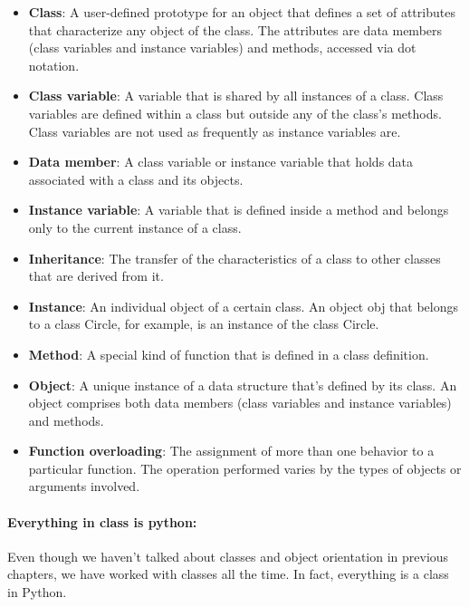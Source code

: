 \documentclass[11pt]{article}
\begin{document}
\begin{itemize}
\item
  \textbf{Class}: A user-defined prototype for an object that defines a
  set of attributes that characterize any object of the class. The
  attributes are data members (class variables and instance variables)
  and methods, accessed via dot notation.
\item
  \textbf{Class variable}: A variable that is shared by all instances of
  a class. Class variables are defined within a class but outside any of
  the class's methods. Class variables are not used as frequently as
  instance variables are.
\item
  \textbf{Data member}: A class variable or instance variable that holds
  data associated with a class and its objects.
\item
  \textbf{Instance variable}: A variable that is defined inside a method
  and belongs only to the current instance of a class.
\item
  \textbf{Inheritance}: The transfer of the characteristics of a class
  to other classes that are derived from it.
\item
  \textbf{Instance}: An individual object of a certain class. An object
  obj that belongs to a class Circle, for example, is an instance of the
  class Circle.
\item
  \textbf{Method}: A special kind of function that is defined in a class
  definition.
\item
  \textbf{Object}: A unique instance of a data structure that's defined
  by its class. An object comprises both data members (class variables
  and instance variables) and methods.
\item
  \textbf{Function overloading}: The assignment of more than one
  behavior to a particular function. The operation performed varies by
  the types of objects or arguments involved.
\end{itemize}

    \paragraph{Everything in class is
python:}\label{everything-in-class-is-python}

Even though we haven't talked about classes and object orientation in
previous chapters, we have worked with classes all the time. In fact,
everything is a class in Python.
\end{document}
